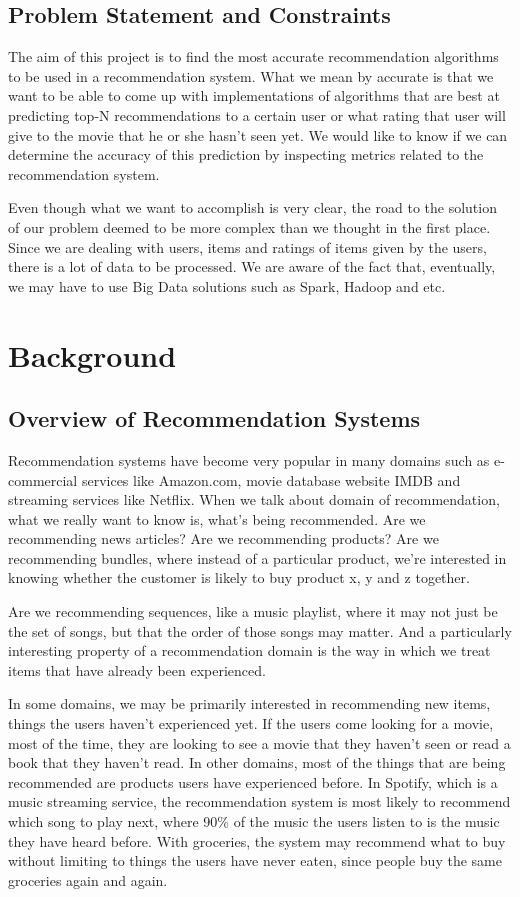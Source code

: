 \documentclass[12pt,a4paper]{report}
\begin{document}
 
\section{Problem Statement and Constraints}

The aim of this project is to find the most accurate recommendation algorithms to be used in a recommendation system. What we mean by accurate is that we want to be able to come up with implementations of algorithms that are best at predicting top-N recommendations to a certain user or what rating that user will give to the movie that he or she hasn't seen yet. We would like to know if we can determine the accuracy of this prediction by inspecting metrics related to the recommendation system. 

Even though what we want to accomplish is very clear, the road to the solution of our problem deemed to be more complex than we thought in the first place. Since we are dealing with users, items and ratings of items given by the users, there is a lot of data to be processed. We are aware of the fact that, eventually, we may have to use Big Data solutions such as Spark, Hadoop and etc. 

\chapter{Background} 

\section{Overview of Recommendation Systems}

Recommendation systems have become very popular in many domains such as e-commercial services like Amazon.com, movie database website IMDB and streaming services like Netflix. When we talk about domain of recommendation, what we really want to know is, what's being recommended. Are we recommending news articles? Are we recommending products? Are we recommending bundles, where instead of a particular product, we're interested in knowing  whether the customer is likely to buy product x, y and z together. 

Are we recommending sequences, like a music playlist, where it may not just be the set of songs, but that the
order of those songs may matter. And a particularly interesting property of a recommendation domain is the way in which we treat
items that have already been experienced.

In some domains, we may be primarily interested in recommending new items, things the users haven’t experienced yet. If the users come looking for a movie, most of the time, they are looking to see a movie that they haven't seen or read a book that they haven't read. In other domains, most of the things that are being recommended are products users have experienced before. In Spotify, which is a music streaming service, the recommendation system is most likely to recommend which song to play next, where 90\% of the music the users listen to is the music they have heard before. With groceries, the system may recommend what to buy without limiting to things the users have never eaten, since people buy the same groceries again and again. 
\end{document}

